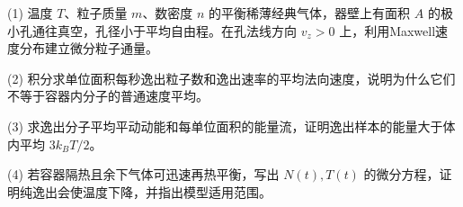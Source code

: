 (1) 温度 \(T\)、粒子质量 \(m\)、数密度 \(n\) 的平衡稀薄经典气体，器壁上有面积 \(A\) 的极小孔通往真空，孔径小于平均自由程。在孔法线方向 \(v_z>0\) 上，利用Maxwell速度分布建立微分粒子通量。

(2) 积分求单位面积每秒逸出粒子数和逸出速率的平均法向速度，说明为什么它们不等于容器内分子的普通速度平均。

(3) 求逸出分子平均平动动能和每单位面积的能量流，证明逸出样本的能量大于体内平均 \(3k_BT/2\)。

(4) 若容器隔热且余下气体可迅速再热平衡，写出 \(N(t),T(t)\) 的微分方程，证明纯逸出会使温度下降，并指出模型适用范围。
